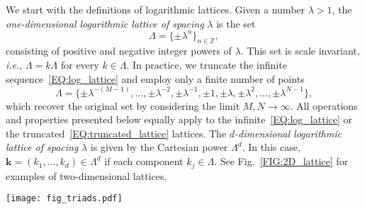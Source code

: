 \documentclass[12pt]{article}
\theoremstyle{definition}
\begin{document}
	We start with the definitions of logarithmic lattices.
	Given a number $\lambda > 1$, the \textit{one-dimensional logarithmic lattice of spacing} $\lambda$ is the set
	\begin{equation}
	\mathbb{\Lambda} = \{ \pm \lambda^n \}_{n \in \mathbb{Z}},
	\label{EQ:log_lattice}
	\end{equation}
	consisting of positive and negative integer powers of $\lambda$.
	This set is scale invariant, \textit{i.e.}, $\mathbb{\Lambda} = k \mathbb{\Lambda}$ for every $k \in \mathbb{\Lambda}$.
	In practice, we truncate the infinite sequence~\eqref{EQ:log_lattice} and employ only a finite number of points
	\begin{equation}
	\mathbb{\Lambda} = \{ \pm \lambda^{-(M-1)}, \dots, \pm \lambda^{-2}, \pm \lambda^{-1}, \pm 1, \pm \lambda, \pm \lambda^2, \dots, \pm \lambda^{N-1} \},
	\label{EQ:truncated_lattice}
	\end{equation}
	which recover the original set by considering the limit $M,N \to \infty$.
	All operations and properties presented below equally apply to the infinite~\eqref{EQ:log_lattice} or the truncated~\eqref{EQ:truncated_lattice} lattices.
	The \textit{$d$-dimensional logarithmic lattice of spacing} $\lambda$ is given by the Cartesian power $\mathbb{\Lambda}^d$.
	In this case, $\mathbf{k} = (k_1,\dots,k_d) \in \mathbb{\Lambda}^d$ if each component $k_j \in \mathbb{\Lambda}$.
	See Fig.~\ref{FIG:2D_lattice} for examples of two-dimensional lattices.
	
	\begin{figure*}[t]
		\centering
		\texttt{[image: fig\_triads.pdf]}
		\caption{Triad interactions on two-dimensional logarithmic lattices of different spacings: (a)~$\lambda = 2$; (b)~$\lambda = \varphi \approx 1.618$, the golden mean; (c)~$\lambda = \sigma \approx 1.325$, the plastic number. The red node $\mathbf{k}$ can be decomposed into sums $\mathbf{k} = \mathbf{p} + \mathbf{q}$ where all possible nodes $\mathbf{p}$ and $\mathbf{q}$ are indicated by the blue lines. All figures are given in the same scale. From (a) to (c), both the density of nodes and the number of triads per each node increase.}
		\label{FIG:2D_lattice}
	\end{figure*}
	
\end{document}
